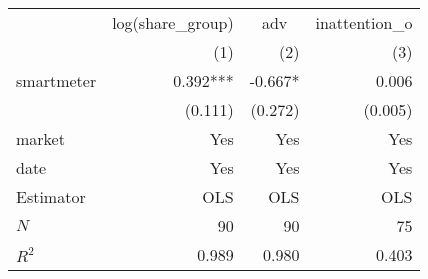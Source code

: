 \begin{tabular}{lrrr}
\toprule
           & \multicolumn{1}{c}{log(share_group)} & \multicolumn{1}{c}{adv} & \multicolumn{1}{c}{inattention_o} \\ 
\cmidrule(lr){2-2} \cmidrule(lr){3-3} \cmidrule(lr){4-4} 
           &                                  (1) &                     (2) &                               (3) \\ 
\midrule
smartmeter &                             0.392*** &                 -0.667* &                             0.006 \\ 
           &                              (0.111) &                 (0.272) &                           (0.005) \\ 
\midrule
market     &                                  Yes &                     Yes &                               Yes \\ 
date       &                                  Yes &                     Yes &                               Yes \\ 
\midrule
Estimator  &                                  OLS &                     OLS &                               OLS \\ 
\midrule
$N$        &                                   90 &                      90 &                                75 \\ 
$R^2$      &                                0.989 &                   0.980 &                             0.403 \\ 
\bottomrule
\end{tabular}
